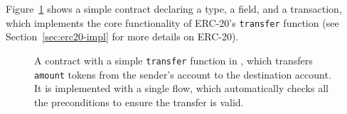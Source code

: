 \documentclass[dvipsnames, usenames, sigconf]{acmart}
\begin{document}
Figure~\ref{fig:erc20-transfer-flow} shows a simple contract declaring a type, a field, and a transaction, which implements the core functionality of ERC-20's \lstinline{transfer} function (see Section~\ref{sec:erc20-impl} for more details on ERC-20).
\begin{figure}[ht]
    \centering
    
    \caption{A contract with a simple \lstinline{transfer} function in \langName, which transfers \lstinline{amount} tokens from the sender's account to the destination account.
It is implemented with a single flow, which automatically checks all the preconditions to ensure the transfer is valid.}
    \label{fig:erc20-transfer-flow}
\end{figure}
%         
%         
\end{document}
